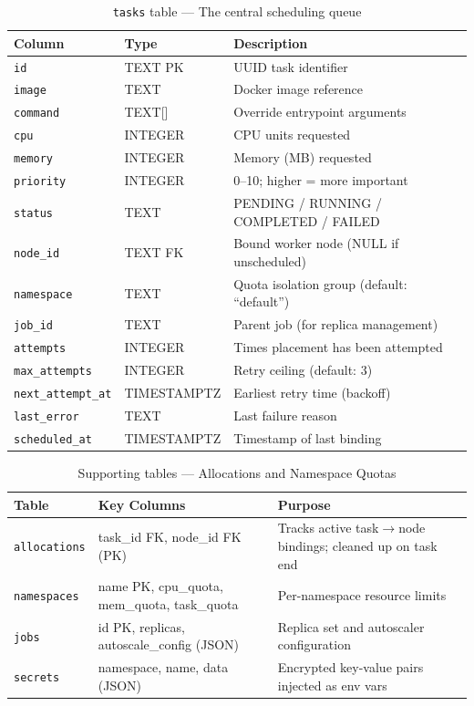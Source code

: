 \documentclass[11pt,a4paper]{article}
\begin{document}
\begin{table}[H]
\centering
\caption{\texttt{tasks} table --- The central scheduling queue}
\label{tab:schema_tasks}
\begin{tabular}{@{} l l l @{}}
\toprule
\textbf{Column} & \textbf{Type} & \textbf{Description} \\
\midrule
\texttt{id}              & TEXT PK      & UUID task identifier \\
\texttt{image}           & TEXT          & Docker image reference \\
\texttt{command}         & TEXT[]        & Override entrypoint arguments \\
\texttt{cpu}             & INTEGER       & CPU units requested \\
\texttt{memory}          & INTEGER       & Memory (MB) requested \\
\texttt{priority}        & INTEGER       & 0--10; higher = more important \\
\texttt{status}          & TEXT          & PENDING / RUNNING / COMPLETED / FAILED \\
\texttt{node\_id}        & TEXT FK       & Bound worker node (NULL if unscheduled) \\
\texttt{namespace}       & TEXT          & Quota isolation group (default: ``default'') \\
\texttt{job\_id}         & TEXT          & Parent job (for replica management) \\
\texttt{attempts}        & INTEGER       & Times placement has been attempted \\
\texttt{max\_attempts}   & INTEGER       & Retry ceiling (default: 3) \\
\texttt{next\_attempt\_at}& TIMESTAMPTZ  & Earliest retry time (backoff) \\
\texttt{last\_error}     & TEXT          & Last failure reason \\
\texttt{scheduled\_at}   & TIMESTAMPTZ   & Timestamp of last binding \\
\bottomrule
\end{tabular}
\end{table}

\begin{table}[H]
\centering
\caption{Supporting tables --- Allocations and Namespace Quotas}
\label{tab:schema_support}
\begin{tabular}{@{} l l l @{}}
\toprule
\textbf{Table} & \textbf{Key Columns} & \textbf{Purpose} \\
\midrule
\texttt{allocations}  & task\_id FK, node\_id FK (PK) & Tracks active task$\to$node bindings; cleaned up on task end \\
\texttt{namespaces}   & name PK, cpu\_quota, mem\_quota, task\_quota & Per-namespace resource limits \\
\texttt{jobs}         & id PK, replicas, autoscale\_config (JSON) & Replica set and autoscaler configuration \\
\texttt{secrets}      & namespace, name, data (JSON) & Encrypted key-value pairs injected as env vars \\
\bottomrule
\end{tabular}
\end{table}
\end{document}
